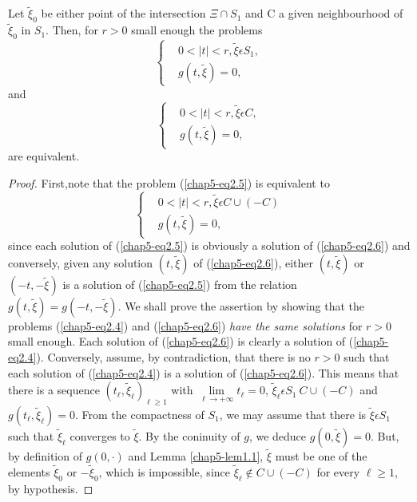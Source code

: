 \begin{lemma}\label{chap5-lem2.1}
Let $\widetilde{\xi}_{0}$ be either point of the intersection $\Xi
\cap S_{1}$ and C a given neighbourhood of $\widetilde{\xi}_{0}$ in
$S_{1}$. Then, for $r > 0$ small enough the problems
\begin{equation*}
\begin{cases}
& 0 < |t| < r, \widetilde{\xi} \epsilon S_{1},\\
& g(t, \widetilde{\xi}) = 0,
\end{cases}\tag{2.4}\label{chap5-eq2.4}
\end{equation*}
and 
\begin{equation*}
\begin{cases}
& 0 < |t| < r, \widetilde{\xi} \epsilon C,\\
& g(t, \widetilde{\xi}) = 0,
\end{cases}\tag{2.5}\label{chap5-eq2.5}
\end{equation*}
are equivalent.
\end{lemma}

\begin{proof}
First,\pageoriginale note that the problem (\ref{chap5-eq2.5}) is
equivalent to
\begin{equation*}
\begin{cases}
& 0 < |t| < r, \widetilde{\xi} \epsilon C \cup (-C)\\
& g(t, \widetilde{\xi}) = 0,
\end{cases}\tag{2.6}\label{chap5-eq2.6}
\end{equation*}
since each solution of (\ref{chap5-eq2.5}) is obviously a solution of
(\ref{chap5-eq2.6}) and conversely, given any solution $(t,
\widetilde{\xi})$ of (\ref{chap5-eq2.6}), either $(t,
\widetilde{\xi})$ or $(-t, -\widetilde{\xi})$ is a solution of
(\ref{chap5-eq2.5}) from the relation $g(t, \widetilde{\xi}) = g(-t,
-\widetilde{\xi})$. We shall prove the assertion by showing that the
problems (\ref{chap5-eq2.4}) and (\ref{chap5-eq2.6}) {\em have the
  same solutions} for $r > 0$ small enough. Each solution of
(\ref{chap5-eq2.6}) is clearly a solution of
(\ref{chap5-eq2.4}). Conversely, assume, by contradiction, that there
is no $r > 0$ such that each solution of (\ref{chap5-eq2.4}) is a
solution of (\ref{chap5-eq2.6}). This means that there is a sequence
$(t_{\ell}, \widetilde{\xi}_{\ell})_{\ell \geq 1}$ with $\lim\limits_{\ell
  \to + \infty} t_{\ell} = 0$, $\widetilde{\xi}_{\ell} \epsilon S_{1}
\ C \cup (-C)$ and $g(t_{\ell}, \widetilde{\xi}_{\ell}) = 0$. From the
compactness of $S_{1}$, we may assume that there is $\widetilde{\xi}
\epsilon S_{1}$ such that $\widetilde{\xi}_{\ell}$ converges to
$\widetilde{\xi}$. By the coninuity of $g$, we deduce $g(0,
\widetilde{\xi}) = 0$. But, by definition of $g(0, \cdot)$ and Lemma
\ref{chap5-lem1.1}, $\widetilde{\xi}$ must be one of the elements
$\widetilde{\xi}_{0}$ or $-\widetilde{\xi}_{0}$, which is impossible,
since $\widetilde{\xi}_{\ell} \notin C \cup (-C)$ for every $\ell \geq 1$,
by hypothesis.
\end{proof}

